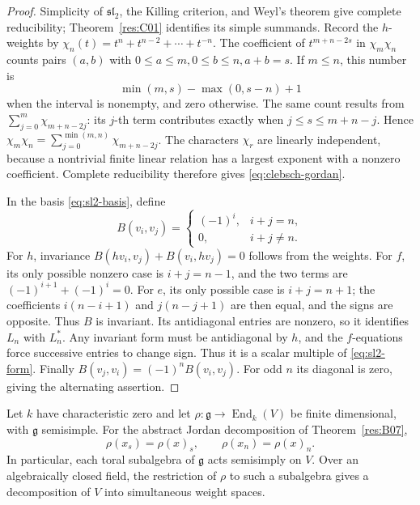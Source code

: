 \begin{proof}
Simplicity of \(\mathfrak{sl}_2\), the Killing
criterion, and Weyl's theorem give complete
reducibility; Theorem~\ref{res:C01} identifies its
simple summands.
Record the \(h\)-weights by
\(\chi_n(t)=t^n+t^{n-2}+\cdots+t^{-n}\).
The coefficient of \(t^{m+n-2s}\) in
\(\chi_m\chi_n\) counts pairs
\((a,b)\) with \(0\leq a\leq m,0\leq b\leq n,a+b=s\).
If \(m\leq n\), this number is
\[
 \min(m,s)-\max(0,s-n)+1
\]
when the interval is nonempty, and zero otherwise.
The same count results from
\(\sum_{j=0}^{m}\chi_{m+n-2j}\): its \(j\)-th
term contributes exactly when
\(j\leq s\leq m+n-j\). Hence
\(\chi_m\chi_n=\sum_{j=0}^{\min(m,n)}
\chi_{m+n-2j}\).
The characters \(\chi_r\) are linearly independent,
because a nontrivial finite linear relation has a
largest exponent with a nonzero coefficient.
Complete reducibility therefore gives
\eqref{eq:clebsch-gordan}.

In the basis \eqref{eq:sl2-basis}, define
\[
 B(v_i,v_j)=
 \begin{cases}(-1)^i,&i+j=n,\\0,&i+j\ne n.\end{cases}
 \tag{3.9}\label{eq:sl2-form}
\]
For \(h\), invariance
\(B(hv_i,v_j)+B(v_i,hv_j)=0\) follows from the
weights. For \(f\), its only possible nonzero
case is \(i+j=n-1\), and the two terms are
\((-1)^{i+1}+(-1)^i=0\).
For \(e\), its only possible case is \(i+j=n+1\);
the coefficients \(i(n-i+1)\) and
\(j(n-j+1)\) are then equal, and the signs
are opposite. Thus \(B\) is invariant.
Its antidiagonal entries are nonzero, so it
identifies \(L_n\) with \(L_n^*\).
Any invariant form must be antidiagonal by \(h\),
and the \(f\)-equations force successive entries
to change sign. Thus it is a scalar multiple
of \eqref{eq:sl2-form}.
Finally
\(B(v_j,v_i)=(-1)^n B(v_i,v_j)\).
For odd \(n\) its diagonal is zero, giving the
alternating assertion.
\end{proof}

\begin{theorem}
\label{res:C07}
Let \(k\) have characteristic zero and let
\(\rho:\mathfrak g\to\operatorname{End}_k(V)\)
be finite dimensional, with \(\mathfrak g\) semisimple.
For the abstract Jordan decomposition of
Theorem~\ref{res:B07},
\[
 \rho(x_s)=\rho(x)_s,\qquad
 \rho(x_n)=\rho(x)_n.
 \tag{3.10}\label{eq:representation-jordan}
\]
In particular, each toral subalgebra of \(\mathfrak g\) acts semisimply on \(V\).
Over an algebraically closed field, the restriction of \(\rho\) to such a
subalgebra gives a decomposition of \(V\) into simultaneous weight spaces.
\end{theorem}

